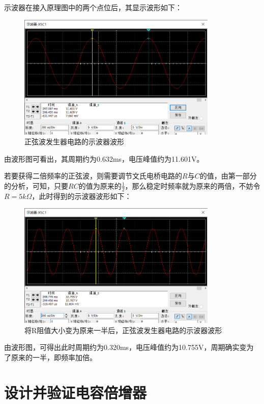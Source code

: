\documentclass[UTF8]{ctexart}
\begin{document}
示波器在接入原理图中的两个点位后，其显示波形如下：
\begin{figure}[H]
\centering
\includegraphics[width=0.85\textwidth]{I.png}
\caption{正弦波发生器电路的示波器波形}
\end{figure}

由波形图可看出，其周期约为0.632ms，电压峰值约为11.601V。

若要获得二倍频率的正弦波，则需要调节文氏电桥电路的$R$与$C$的值，由第一部分的分析，可知，只要$RC$的值为原来的$\frac{1}{2}$，那么稳定时频率就为原来的两倍，不妨令$R=5k\Omega$，此时得到的示波器波形如下：
\begin{figure}[H]
\centering
\includegraphics[width=0.85\textwidth]{J.png}
\caption{将R阻值大小变为原来一半后，正弦波发生器电路的示波器波形}
\end{figure}

由波形图，可得出此时周期约为0.320ms，电压峰值约为10.755V，周期确实变为了原来的一半，即频率加倍。
\section{设计并验证电容倍增器}
\end{document}
